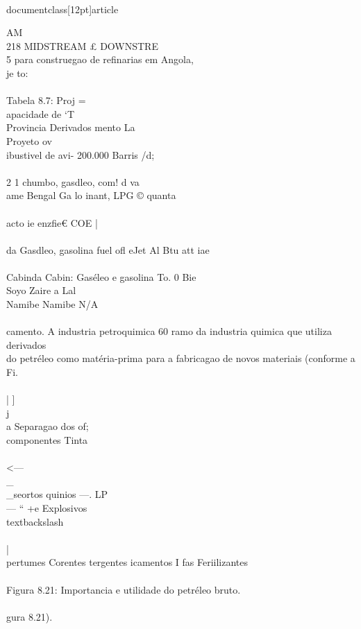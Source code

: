 \\documentclass[12pt]{article}
\begin{document}
AM\\
218 MIDSTREAM £ DOWNSTRE\\
5 para constru¢gao de refinarias em Angola,\\
je to:\\
\\
Tabela 8.7: Proj =\\
apacidade de ‘T\\
Provincia Derivados mento La\\
Proyeto ov\\
ibustivel de avi- 200.000 Barris /d;\\
\\
2 1 chumbo, gasdleo, com! d va\\
ame Bengal Ga lo inant, LPG © quanta\\
\\
acto ie enzfie€ COE |\\
\\
da Gasdleo, gasolina fuel ofl eJet Al Btu att iae\\
\\
Cabinda Cabin: Gaséleo e gasolina To. 0 Bie\\
Soyo Zaire a Lal\\
Namibe Namibe N/A\\
\\
camento. A industria petroquimica 60 ramo da industria quimica que utiliza derivados\\
do petréleo como matéria-prima para a fabricagao de novos materiais (conforme a Fi.\\
\\
| ]\\
j\\
a Separagao dos of;\\
componentes Tinta\\
\\
<—\\_\\_seortos quinios —. LP\\
— “ +e Explosivos\\textbackslash{}\\
\\
|\\
pertumes Corentes tergentes icamentos I fas Feriilizantes\\
\\
Figura 8.21: Importancia e utilidade do petréleo bruto.\\
\\
gura 8.21).\\
\\
\end{document}
